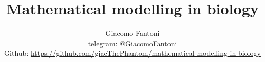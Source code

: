 

\title{\Huge\textbf{{Mathematical modelling in biology}}}

\author{
  Giacomo Fantoni \\
  \small telegram: \href{https://t.me/GiacomoFantoni}{@GiacomoFantoni} \\[3pt]
  \small Github: \href{https://github.com/giacThePhantom/mathematical-modelling-in-biology}{https://github.com/giacThePhantom/mathematical-modelling-in-biology}\\
}




  \maketitle
  \tableofcontents

  


